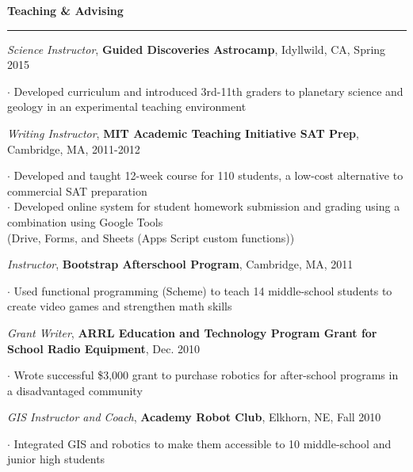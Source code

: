 \documentclass[11pt]{article}
\begin{document}
\vspace*{0.25 mm}
\textbf{Teaching \& Advising}
\smallskip
\hrule
\emph{Science Instructor}, \textbf{Guided Discoveries Astrocamp}, Idyllwild, CA, Spring 2015\\
\begin{small}$\cdot$ {Developed curriculum and introduced 3rd-11th graders to planetary science and geology in an experimental teaching environment}\end{small}

\emph{Writing Instructor}, \textbf{MIT Academic Teaching Initiative SAT Prep}, Cambridge, MA, 2011-2012\\
\begin{small}$\cdot$ {Developed and taught 12-week course for 110 students, a low-cost alternative to commercial SAT preparation}\\
$\cdot$ {Developed online system for student homework submission and grading using a combination using Google Tools \\ 
\hspace*{5 mm}(Drive, Forms, and Sheets (Apps Script custom functions))}\end{small}

\emph{Instructor}, \textbf{Bootstrap Afterschool Program}, Cambridge, MA, 2011\\
\begin{small}$\cdot$ {Used functional programming (Scheme) to teach 14 middle-school students to create video games and strengthen math skills}\end{small}

\emph{Grant Writer}, \textbf{ARRL Education and Technology Program Grant for School Radio Equipment}, Dec. 2010\\
\begin{small}$\cdot$ {Wrote successful \$3,000 grant to purchase robotics for after-school programs in a disadvantaged community}\end{small}

\emph{GIS Instructor and Coach}, \textbf{Academy Robot Club}, Elkhorn, NE, Fall 2010\\
\begin{small}$\cdot$ {Integrated GIS and robotics to make them accessible to 10 middle-school and junior high students}\end{small}
\end{document}
